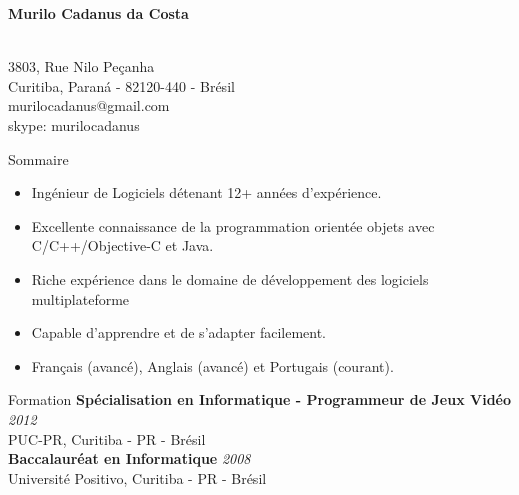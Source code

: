 \documentclass{resume}
\begin{document}


  \begin{center}
    {\fontsize{16}{18} \bf Murilo Cadanus da Costa} \\\\
  \end{center}
  \begin{center}
    {\fontsize{12}{14} 3803, Rue Nilo Peçanha} \\ 
    {\fontsize{12}{14} Curitiba, Paraná - 82120-440 - Brésil} \\
    {\fontsize{12}{14} murilocadanus@gmail.com} \\
    {\fontsize{12}{14} skype: murilocadanus}
  \end{center}

  \begin{rSection}{Sommaire}
  \end{rSection}

  \begin{itemize}
     \item Ingénieur de Logiciels détenant 12+ années d’expérience.
     \item Excellente connaissance de la programmation orientée objets avec C/C++/Objective-C et Java.
     \item Riche expérience dans le domaine de développement des logiciels multiplateforme%
     \item Capable d'apprendre et de s'adapter facilement.
     \item Français (avancé), Anglais (avancé) et Portugais (courant).
  \end{itemize}

  \begin{rSection}{Formation}
    {\bf Spécialisation en Informatique - Programmeur de Jeux Vidéo } \hfill {\em 2012} \\
    {PUC-PR, Curitiba - PR - Brésil} \\ 

    {\bf Baccalauréat en Informatique } \hfill {\em 2008} \\
    {Université Positivo, Curitiba - PR - Brésil}   
  \end{rSection}
  
\end{document}

